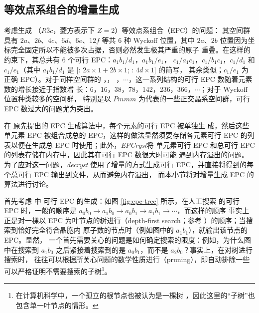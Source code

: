 \subsection{等效点系组合的增量生成}\label{ssec:incr-epc}

考虑生成 （$R\bar3c$，菱方表示下 $Z = 2$）等效点系组合（EPC）的问题：
其空间群具有 $2a$、$2b$、$4c$、$6d$、$6e$、$12f$ 等共 6 种 Wyckoff 位置，其中
$2a$、$2b$ 位置因为坐标完全固定所以不能被多次占据，否则必然发生极其严重的原子
重叠。在这样的约束下，其总共有 6 个可行 EPC：$a_1b_1/d_1$，$a_1b_1/e_1$，%
$c_1/a_1c_1$，$c_1/b_1c_1$，$c_1/d_1$ 和 $c_1/e_1$（其中 $a_1b_1/d_1$ 是
[: $2a\times1+2b\times1$; : $4d\times1$] 的简写，
其余类似；$c_1/e_1$ 为正确 EPC）。对于同样空间群的 ，，%
，$\cdots$，这一系列结构的可行 EPC 数随着元素数的增长接近于指数增
长：6，16，38，78，142，236，366，$\cdots$；对于 Wyckoff 位置种类较多的空间群，
特别是以 $Pmmm$ 为代表的一些正交晶系空间群，可行 EPC 数过大的问题尤为突出。

在 \textcite{deng2009}原先提出的 EPC 生成算法中，每个元素的可行 EPC 被单独生
成，然后这些单元素 EPC 被组合成总的 EPC，这样的做法显然须要存储各元素可行 EPC
的列表以便在生成总 EPC 时使用；此外，\emph{EPCryst}\parencite{deng2011}将
单元素可行 EPC 和总可行 EPC 的列表存储在内存中，因此其在可行 EPC 数很大时可能
遇到内存溢出的问题。为了应对这一问题，\emph{decryst} 使用了增量的方式生成可行
EPC，并直接将得到的每个总可行 EPC 输出到文件，从而避免内存溢出，
而本小节将对增量生成 EPC 的算法进行讨论。

首先考虑  中  可行 EPC 的生成：如图 \ref{fig:epc-tree}
所示，在人工搜索  的可行 EPC 时，一般的顺序是 $a_0b_0 \rightarrow
a_1b_0 \rightarrow a_0b_1 \rightarrow a_1b_1 \rightarrow \cdots$，而这样的顺序
事实上正是对一棵以 EPC 为叶节点的树进行（depth-first
search；参考 \cite[603-612]{cormen2009}）的顺序；当搜索到恰好完全符合晶胞内
 原子数的节点时（例如图中的 $a_1b_1$），就输出该节点的 EPC。显然，
一个首先需要关心的问题是如何确定搜索的限度：例如，为什么图中在搜索到 $a_1b_0$
之后紧接着搜索到的是 $a_0b_1$，而不是 $a_2b_0$？事实上，在对树进行搜索时，
往往可以根据所关心问题的数学性质进行（pruning），即自动排除一些
可以严格证明不需要搜索的子树\footnote{%
	在计算机科学中，一个孤立的根节点也被认为是一棵树%
	\parencite[176]{cormen2009}，因此这里的“子树”也包含单一叶节点的情形。%
}。

